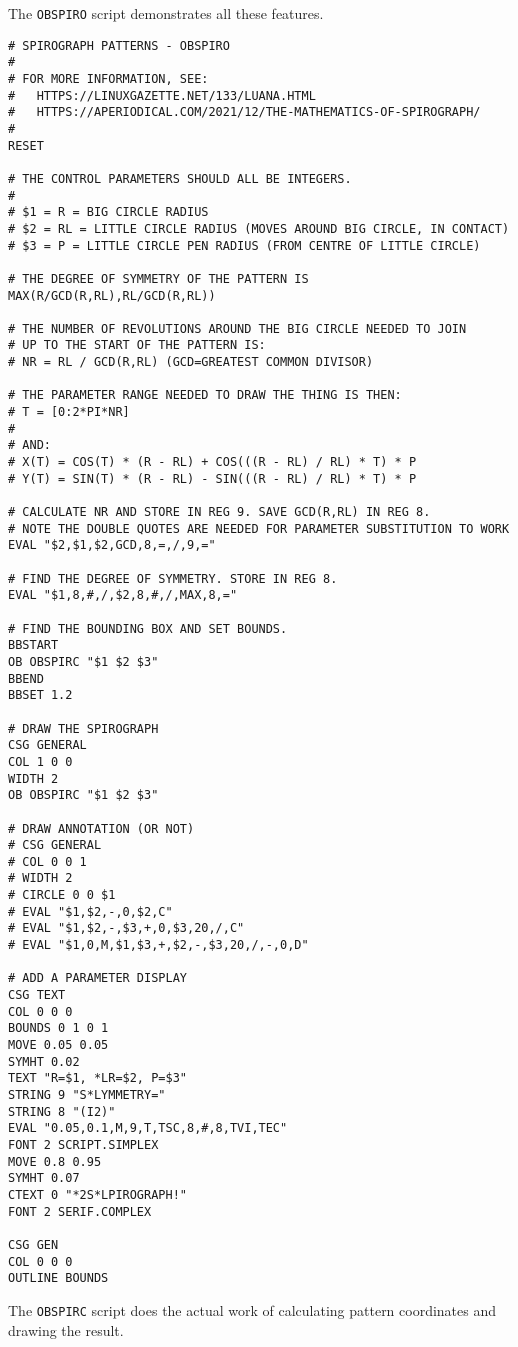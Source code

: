 \documentclass[a4paper,twoside,11pt]{article}
\newcommand{\newpara}{\par\vspace{4mm}\noindent}
\begin{document}
\newpara
The \texttt{OBSPIRO} script demonstrates all these features.

\begin{lstlisting}
# SPIROGRAPH PATTERNS - OBSPIRO
#
# FOR MORE INFORMATION, SEE:
#   HTTPS://LINUXGAZETTE.NET/133/LUANA.HTML
#   HTTPS://APERIODICAL.COM/2021/12/THE-MATHEMATICS-OF-SPIROGRAPH/
#
RESET

# THE CONTROL PARAMETERS SHOULD ALL BE INTEGERS.
#
# $1 = R = BIG CIRCLE RADIUS
# $2 = RL = LITTLE CIRCLE RADIUS (MOVES AROUND BIG CIRCLE, IN CONTACT)
# $3 = P = LITTLE CIRCLE PEN RADIUS (FROM CENTRE OF LITTLE CIRCLE)

# THE DEGREE OF SYMMETRY OF THE PATTERN IS MAX(R/GCD(R,RL),RL/GCD(R,RL))

# THE NUMBER OF REVOLUTIONS AROUND THE BIG CIRCLE NEEDED TO JOIN
# UP TO THE START OF THE PATTERN IS:
# NR = RL / GCD(R,RL) (GCD=GREATEST COMMON DIVISOR)

# THE PARAMETER RANGE NEEDED TO DRAW THE THING IS THEN:
# T = [0:2*PI*NR]
#
# AND:
# X(T) = COS(T) * (R - RL) + COS(((R - RL) / RL) * T) * P
# Y(T) = SIN(T) * (R - RL) - SIN(((R - RL) / RL) * T) * P

# CALCULATE NR AND STORE IN REG 9. SAVE GCD(R,RL) IN REG 8.
# NOTE THE DOUBLE QUOTES ARE NEEDED FOR PARAMETER SUBSTITUTION TO WORK
EVAL "$2,$1,$2,GCD,8,=,/,9,="

# FIND THE DEGREE OF SYMMETRY. STORE IN REG 8.
EVAL "$1,8,#,/,$2,8,#,/,MAX,8,="

# FIND THE BOUNDING BOX AND SET BOUNDS.
BBSTART
OB OBSPIRC "$1 $2 $3"
BBEND
BBSET 1.2

# DRAW THE SPIROGRAPH
CSG GENERAL
COL 1 0 0
WIDTH 2
OB OBSPIRC "$1 $2 $3"

# DRAW ANNOTATION (OR NOT)
# CSG GENERAL
# COL 0 0 1
# WIDTH 2
# CIRCLE 0 0 $1
# EVAL "$1,$2,-,0,$2,C"
# EVAL "$1,$2,-,$3,+,0,$3,20,/,C"
# EVAL "$1,0,M,$1,$3,+,$2,-,$3,20,/,-,0,D"

# ADD A PARAMETER DISPLAY
CSG TEXT
COL 0 0 0
BOUNDS 0 1 0 1
MOVE 0.05 0.05
SYMHT 0.02
TEXT "R=$1, *LR=$2, P=$3"
STRING 9 "S*LYMMETRY="
STRING 8 "(I2)"
EVAL "0.05,0.1,M,9,T,TSC,8,#,8,TVI,TEC"
FONT 2 SCRIPT.SIMPLEX
MOVE 0.8 0.95
SYMHT 0.07
CTEXT 0 "*2S*LPIROGRAPH!"
FONT 2 SERIF.COMPLEX

CSG GEN
COL 0 0 0
OUTLINE BOUNDS
\end{lstlisting}

\newpara
The \texttt{OBSPIRC} script does the actual work of calculating pattern
coordinates and drawing the result.
\end{document}
